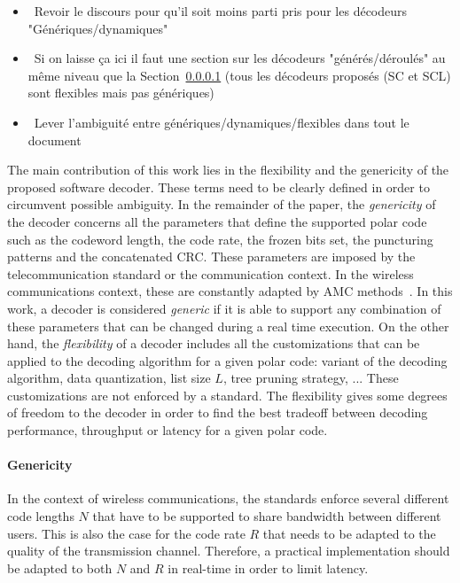 \begin{itemize}{}
  \item \xmark~Revoir le discours pour qu'il soit moins parti pris pour les
    décodeurs "Génériques/dynamiques"
  \item \xmark~Si on laisse ça ici il faut une section sur les décodeurs
    "générés/déroulés" au même niveau que la
    Section~\ref{sec:alg_polar_genericity} (tous les décodeurs proposés (SC et
    SCL) sont flexibles mais pas génériques)
  \item \xmark~Lever l'ambiguité entre génériques/dynamiques/flexibles dans tout
    le document
\end{itemize}

The main contribution of this work lies in the flexibility and the genericity of
the proposed software decoder. These terms need to be clearly defined in order
to circumvent possible ambiguity. In the remainder of the paper, the
\textit{genericity} of the decoder concerns all the parameters that define the
supported polar code such as the codeword length, the code rate, the frozen bits
set, the puncturing patterns and the concatenated CRC. These parameters are
imposed by the telecommunication standard or the communication context. In the
wireless communications context, these are constantly adapted by AMC
methods~\cite{Dahlman2013}. In this work, a decoder is considered
\textit{generic} if it is able to support any combination of these parameters
that can be changed during a real time execution. On the other hand, the
\textit{flexibility} of a decoder includes all the customizations that can be
applied to the decoding algorithm for a given polar code: variant of the
decoding algorithm, data quantization, list size $L$, tree pruning strategy, ...
These customizations are not enforced by a standard. The flexibility gives some
degrees of freedom to the decoder in order to find the best tradeoff between
decoding performance, throughput or latency for a given polar code.

\paragraph{Genericity}
\label{sec:alg_polar_genericity}

In the context of wireless communications, the standards enforce several
different code lengths $N$ that have to be supported to share bandwidth between
different users. This is also the case for the code rate $R$ that needs to be
adapted to the quality of the transmission channel. Therefore, a practical
implementation should be adapted to both $N$ and $R$ in real-time in order to
limit latency.


